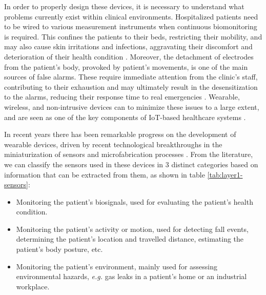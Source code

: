 In order to properly design these devices, it is necessary to understand what problems currently exist within clinical environments. Hospitalized patients need to be wired to various measurement instruments when continuous biomonitoring is required. This confines the patients to their beds, restricting their mobility, and may also cause skin irritations and infections, aggravating their discomfort and deterioration of their health condition \cite{Darwish2011}. Moreover, the detachment of electrodes from the patient's body, provoked by patient's movements, is one of the main sources of false alarms. These require immediate attention from the clinic's staff, contributing to their exhaustion and may ultimately result in the desensitization to the alarms, reducing their response time to real emergencies \cite{DursunErgezen2020}. Wearable, wireless, and non-intrusive devices can to minimize these issues to a large extent, and are seen as one of the key components of \acs{IoT}-based healthcare systems \cite{Baker2017}.  \bigskip

In recent years there has been remarkable progress on the development of wearable devices, driven by recent technological breakthroughs in the miniaturization of sensors and microfabrication processes \cite{Adame2018}. From the literature, we can classify the sensors used in these devices in 3 distinct categories based on information that can be extracted from them, as shown in table \ref{tab:layer1-sensors}:

\begin{itemize}
    \item Monitoring the patient's biosignals, used for evaluating the patient's health condition.
    \item Monitoring the patient's activity or motion, used for detecting fall events, determining the patient's location and travelled distance, estimating the patient's body posture, etc.
    \item Monitoring the patient's environment, mainly used for assessing environmental hazards, \textit{e.g.} gas leaks in a patient's home or an industrial workplace.
\end{itemize}

